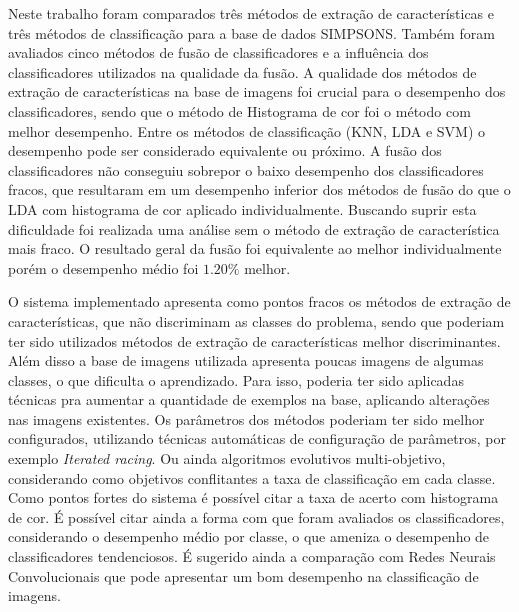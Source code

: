 \documentclass[journal]{IEEEtran}
\begin{document}
Neste trabalho foram comparados três métodos de extração de características e três métodos de classificação para a base de dados SIMPSONS.
Também foram avaliados cinco métodos de fusão de classificadores e a influência dos classificadores utilizados na qualidade da fusão.
A qualidade dos métodos de extração de características na base de imagens foi crucial para o desempenho dos classificadores, sendo que o método de Histograma de cor foi o método com melhor desempenho.
Entre os métodos de classificação (KNN, LDA e SVM) o desempenho pode ser considerado equivalente ou próximo.
A fusão dos classificadores não conseguiu sobrepor o baixo desempenho dos classificadores fracos, que resultaram em um desempenho inferior dos métodos de fusão do que o LDA com histograma de cor aplicado individualmente.
Buscando suprir esta dificuldade foi realizada uma análise sem o método de extração de característica mais fraco.
O resultado geral da fusão foi equivalente ao melhor individualmente porém o desempenho médio foi $1.20\%$ melhor.

O sistema implementado apresenta como pontos fracos os métodos de extração de características, que não discriminam as classes do problema, sendo que poderiam ter sido utilizados métodos de extração de características melhor discriminantes.
Além disso a base de imagens utilizada apresenta poucas imagens de algumas classes, o que dificulta o aprendizado.
Para isso, poderia ter sido aplicadas técnicas pra aumentar a quantidade de exemplos na base, aplicando alterações nas imagens existentes.
Os parâmetros dos métodos poderiam ter sido melhor configurados, utilizando técnicas automáticas de configuração de parâmetros, por exemplo {\it Iterated racing}. Ou ainda algoritmos evolutivos multi-objetivo, considerando como objetivos conflitantes a taxa de classificação em cada classe.
Como pontos fortes do sistema é possível citar a taxa de acerto com histograma de cor.
É possível citar ainda a forma com que foram avaliados os classificadores, considerando o desempenho médio por classe, o que ameniza o desempenho de classificadores tendenciosos.
É sugerido ainda a comparação com Redes Neurais Convolucionais que pode apresentar um bom desempenho na classificação de imagens.
\end{document}
